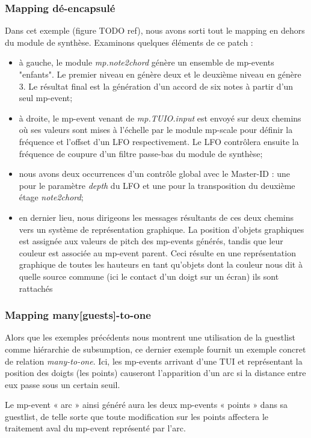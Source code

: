 \subsubsection{Mapping dé-encapsulé}

Dans cet exemple (figure TODO ref), nous avons sorti tout le mapping en dehors du module de synthèse. Examinons quelques éléments de ce patch :
\vspace{-1em}
\begin{itemize}[noitemsep]
	\item à gauche, le module \textit{mp.note2chord} génère un ensemble de mp-events "enfants". Le premier niveau en génère deux et le deuxième niveau en génère 3. Le résultat final est la génération d'un accord de six notes à partir d'un seul mp-event;
	\item à droite, le mp-event venant de \textit{mp.TUIO.input} est envoyé sur deux chemins où ses valeurs sont mises à l'échelle par le module mp-scale pour définir la fréquence et l'offset d'un LFO respectivement. Le LFO contrôlera ensuite la fréquence de coupure d'un filtre passe-bas du module de synthèse;
	\item nous avons deux occurrences d'un contrôle global avec le Master-ID : une pour le paramètre \textit{depth} du LFO et une pour la transposition du deuxième étage \textit{note2chord};
	\item en dernier lieu, nous dirigeons les messages résultants de ces deux chemins vers un système de représentation graphique. La position d'objets graphiques est assignée aux valeurs de pitch des mp-events générés, tandis que leur couleur est associée au mp-event parent. Ceci résulte en une représentation graphique de toutes les hauteurs en tant qu'objets dont la couleur nous dit à quelle source commune (ici le contact d'un doigt sur un écran) ils sont rattachés
\end{itemize}

\subsubsection*{Mapping many[guests]-to-one}
Alors que les exemples précédents nous montrent une utilisation de la guestlist comme hiérarchie de subsumption, ce dernier exemple fournit un exemple concret de relation \textit{many-to-one}. Ici, les mp-events arrivant d'une TUI et représentant la position des doigts (les points) causeront l'apparition d'un arc si la distance entre eux passe sous un certain seuil.

Le mp-event « arc » ainsi généré aura les deux mp-events « points » dans sa guestlist, de telle sorte que toute modification sur les points affectera le traitement aval du mp-event représenté par l'arc.

